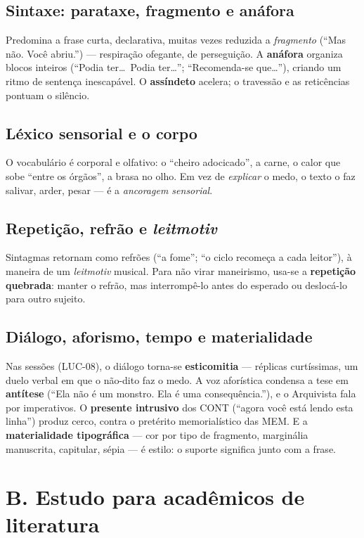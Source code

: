 \subsection*{Sintaxe: parataxe, fragmento e anáfora}
Predomina a frase curta, declarativa, muitas vezes reduzida a \emph{fragmento}
(``Mas não. Você abriu.'') --- respiração ofegante, de perseguição. A
\textbf{anáfora} organiza blocos inteiros (``Podia ter\ldots\ Podia ter\ldots'';
``Recomenda-se que\ldots''), criando um ritmo de sentença inescapável. O
\textbf{assíndeto} acelera; o travessão e as reticências pontuam o silêncio.

\subsection*{Léxico sensorial e o corpo}
O vocabulário é corporal e olfativo: o ``cheiro adocicado'', a carne, o calor
que sobe ``entre os órgãos'', a brasa no olho. Em vez de \emph{explicar} o
medo, o texto o faz salivar, arder, pesar --- é a \emph{ancoragem sensorial}.

\subsection*{Repetição, refrão e \emph{leitmotiv}}
Sintagmas retornam como refrões (``a fome''; ``o ciclo recomeça a cada
leitor''), à maneira de um \emph{leitmotiv} musical. Para não virar maneirismo,
usa-se a \textbf{repetição quebrada}: manter o refrão, mas interrompê-lo antes
do esperado ou deslocá-lo para outro sujeito.

\subsection*{Diálogo, aforismo, tempo e materialidade}
Nas sessões (LUC-08), o diálogo torna-se \textbf{esticomitia} --- réplicas
curtíssimas, um duelo verbal em que o não-dito faz o medo. A voz aforística
condensa a tese em \textbf{antítese} (``Ela não é um monstro. Ela é uma
consequência.''), e o Arquivista fala por imperativos. O \textbf{presente
intrusivo} dos CONT (``agora você está lendo esta linha'') produz cerco,
contra o pretérito memorialístico das MEM. E a \textbf{materialidade
tipográfica} --- cor por tipo de fragmento, marginália manuscrita, capitular,
sépia --- é estilo: o suporte significa junto com a frase.

\section*{B. Estudo para acadêmicos de literatura}

